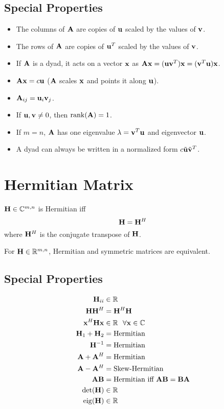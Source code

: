 \subsection*{Special Properties}
\begin{itemize}
\item The columns of $\mathbf{A}$ are copies of $\mathbf{u}$ scaled by the values of $\mathbf{v}$.
\item The rows of $\mathbf{A}$ are copies of $\mathbf{u}^T$ scaled by the values of $\mathbf{v}$.
\item If $\mathbf{A}$ is a dyad, it acts on a vector $\mathbf{x}$ as $\mathbf{A}\mathbf{x}=(\mathbf{u}\mathbf{v}^T)\mathbf{x}=(\mathbf{v}^T\mathbf{u})\mathbf{x}$.
\item $\mathbf{A}\mathbf{x}=c\mathbf{u}$ ($\mathbf{A}$ scales $\mathbf{x}$ and points it along $\mathbf{u}$).
\item $\mathbf{A}_{ij}=\mathbf{u}_i\mathbf{v}_j$.
\item If $\mathbf{u},\mathbf{v}\ne0$, then $\operatorname{rank}(\mathbf{A})=1$.
\item If $m=n$, $\mathbf{A}$ has one eigenvalue $\lambda=\mathbf{v}^T\mathbf{u}$ and eigenvector $\mathbf{u}$.
\item A dyad can always be written in a normalized form $c\tilde{\mathbf{u}}\tilde{\mathbf{v}}^T$.
\end{itemize}



\section{Hermitian Matrix}
$\mathbf{H}\in\mathbb{C}^{m,n}$ is Hermitian iff
\begin{equation}
\mathbf{H}=\mathbf{H}^H
\end{equation}
where $\mathbf{H}^H$ is the conjugate transpose of $\mathbf{H}$.

For $\mathbf{H}\in\mathbb{R}^{m,n}$, Hermitian and symmetric matrices are equivalent.

\subsection*{Special Properties}
\begin{align}
\mathbf{H}_{ii} &\in \mathbb{R}      \\
\mathbf{H}\mathbf{H}^H &=   \mathbf{H}^H\mathbf{H} \\
\mathbf{x}^H\mathbf{H}\mathbf{x} &\in \mathbb{R}~~\forall\mathbf{x}\in\mathbb{C} \\
\mathbf{H}_1+\mathbf{H}_2 &= \textrm{Hermitian} \\
\mathbf{H}^{-1}    &= \textrm{Hermitian} \\
\mathbf{A}+\mathbf{A}^H   &= \textrm{Hermitian} \\
\mathbf{A}-\mathbf{A}^H   &= \textrm{Skew-Hermitian} \\
\mathbf{A}\mathbf{B}      &= \textrm{Hermitian iff $\mathbf{A}\mathbf{B}=\mathbf{B}\mathbf{A}$} \\
\det(\mathbf{H})   &\in \mathbb{R} \\
\operatorname{eig}(\mathbf{H})   &\in \mathbb{R}
\end{align}


